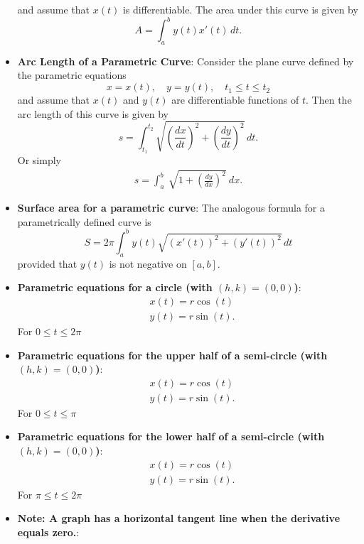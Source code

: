 \documentclass{report}
\begin{document}
\begin{itemize}
\[            \]
            and assume that \( x(t) \) is differentiable. The area under this curve is given by
            \[
                A = \int_{a}^{b} y(t) x'(t) \, dt.
            \]
        \item \textbf{Arc Length of a Parametric Curve}:
            Consider the plane curve defined by the parametric equations
            \[
                x = x(t), \quad y = y(t), \quad t_1 \leq t \leq t_2
            \]
            and assume that \( x(t) \) and \( y(t) \) are differentiable functions of \( t \). Then the arc length of this curve is given by
            \[
                s = \int_{t_1}^{t_2} \sqrt{\left(\frac{dx}{dt}\right)^2 + \left(\frac{dy}{dt}\right)^2} \, dt.
            \]
            Or simply
            \begin{align*}
                s = \int_{a}^{b}\ \sqrt{1 + \left(\frac{dy}{dx}\right)^{2}}\ dx
            .\end{align*}
        \item \textbf{Surface area for a parametric curve}:
            The analogous formula for a parametrically defined curve is
            \[
                S = 2\pi \int_{a}^{b} y(t) \sqrt{(x'(t))^2 + (y'(t))^2} \, dt
            \]
            provided that \( y(t) \) is not negative on \([a, b]\).
        \item \textbf{Parametric equations for a circle (with $(h,k) = (0,0)$)}:
            \begin{align*}
                &x(t) = r\cos{(t)} \\
                &y(t) = r\sin{(t)}
            .\end{align*}
            For $0 \leq t \leq 2\pi $
        \item \textbf{Parametric equations for the upper half of a semi-circle (with $(h,k) = (0,0)$)}:
            \begin{align*}
                &x(t) = r\cos{(t)} \\
                &y(t) = r\sin{(t)}
            .\end{align*}
            For $0 \leq t \leq \pi $
        \item \textbf{Parametric equations for the lower half of a semi-circle (with $(h,k) = (0,0)$)}:
            \begin{align*}
                &x(t) = r\cos{(t)} \\
                &y(t) = r\sin{(t)}
            .\end{align*}
            For $\pi \leq t \leq 2\pi $
        \item \textbf{Note: A graph has a horizontal tangent line when the derivative equals zero.}:

\end{itemize}
\end{document}
